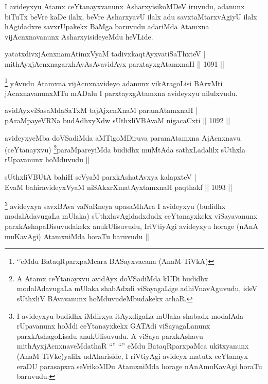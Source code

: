 \begin{artha}
I avideyxyu Atamx ceYtanayxvanunx AsharxyisikoMDeV iruvudu, adanunx biTuTx beVre kaDe ilalx, beVre AsharxyavU ilalx adu savxtaMtarxvAgiyU ilalx hAgidadxre savxrUpakekx BaMga baruvudu adariMda Atamxna vijAcnxnavanunx AsharxyisideyeMdu heVLide.
\end{artha}


\begin{shl}
yatatxdivxjAcnxnamAtimxVyaM tadivxkaqtAyxvatiSaThxteV | \\
mithAyxjAcnxnagarxhAyAsAvavidAyx parxtayxgAtamxnaH \hfill||  1091 || 
\end{shl}

\begin{artha}
\footnote{`\stext'eMdu BataqRparxpaMcara BASayxvacana (AnaM-TiVkA)}
yAvudu Atamxna vijAcnxnavideyo adanunx vikAragoLisi BArxMti jAcnxnavanunxMTu mADalu I parxtayxgAtamxna avideyxyu nilulxvudu.
\end{artha}


\begin{shl}
avidAyxviSasaMdaSaTxM tajAjxcnXnaM paramAtamxnaH | \\
pAraMpayeVRNa budAdhxyXdw sUthxliVBAvaM nigacaCxti \hfill||  1092 ||  
\end{shl}

\begin{artha}
avideyxyeMba doVSadiMda aMTigoMDiruva paramAtamxna AjAcnxnavu (ceYtanayxvu) \footnote{A Atamx ceYtanayxvu avidAyx doVSadiMda kUDi budidhx modalAdavugaLa mUlaka shabAdxdi viSayagaLige adhiVnavAguvudu, ideV sUthxliV BAvavanunx hoMduvudeMbudakekx athaR.}paraMpareyiMda budidhx muMtAda sathxLadalilx sUthxla rUpavanunx hoMduvudu ||
\end{artha}


\begin{shl}
sUthxliVBUtA bahiH seVyaM parxkAshatAvxya kalapxteV | \\
EvaM bahiravideyxVyaM niSAkxrXmatAyxtamxnaH paqthakf \hfill||  1093 ||  
\end{shl}

\begin{artha}
\footnote{I avideyxyu budidhx iMdirxya itAyxdigaLa mUlaka shabadx modalAda rUpavanunx hoMdi ceYtanayxkekx GATAdi viSayagaLanunx parxkAshagoLisalu anukUlisuvudu. A viSaya parxkAshavu mithAyxjAcnxnaveMdathaR ``\stext'' ``\stext'' eMdu BataqRparxpaMca ukitxyanunx (AnaM-TiVke)yalilx udAhariside, I riVtiyAgi avideyx matutx ceYtanayx eraDU parasapxra seVrikoMDu AtamxniMda horage nAnAmuKavAgi horaTu baruvudu.}
avideyxya savxBAva vaNaRneya upasaMhAra I avideyxyu (budidhx modalAdavugaLa mUlaka) sUthxlavAgidadxdudx ceYtanayxkekx viSayavanunx parxkAshapaDisuvudakekx anukUlisuvudu, IriVtiyAgi avideyxyu horage (nAnA muKavAgi) AtamxniMda horaTu baruvudu ||
\end{artha}

